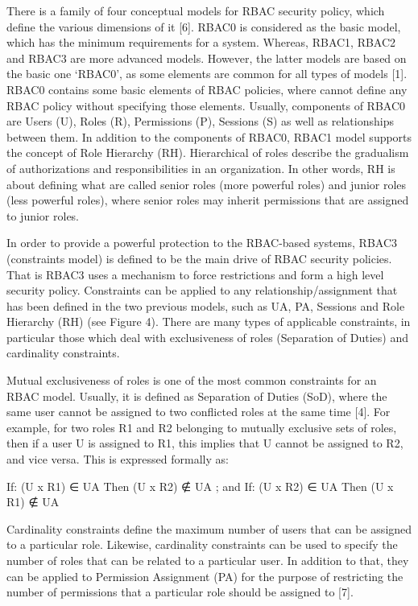 There is a family of four conceptual models for RBAC security policy, which define the various dimensions of it [6].  RBAC0 is considered as the basic model, which has the minimum requirements for a system.  Whereas, RBAC1, RBAC2 and RBAC3 are more advanced models.  However, the latter models are based on the basic one ‘RBAC0’, as some elements are common for all types of models [1].
     RBAC0 contains some basic elements of RBAC policies, where cannot define any RBAC policy without specifying those elements.  Usually, components of RBAC0 are Users (U), Roles (R), Permissions (P), Sessions (S) as well as relationships between them.  
In addition to the components of RBAC0, RBAC1 model supports the concept of Role Hierarchy (RH).  Hierarchical of roles describe the gradualism of authorizations and responsibilities in an organization.  In other words, RH is about defining what are called senior roles (more powerful roles) and junior roles (less powerful roles), where senior roles may inherit permissions that are assigned to junior roles.

      In order to provide a powerful protection to the RBAC-based systems, RBAC3 (constraints model) is defined to be the main drive of RBAC security policies.  That is RBAC3 uses a mechanism to force restrictions and form a high level security policy.  Constraints can be applied to any relationship/assignment that has been defined in the two previous models, such as UA, PA, Sessions and Role Hierarchy (RH) (see Figure 4).  There are many types of applicable constraints, in particular those which deal with exclusiveness of roles (Separation of Duties) and cardinality constraints.
      
      Mutual exclusiveness of roles is one of the most common constraints for an RBAC model.  Usually, it is defined as Separation of Duties (SoD), where the same user cannot be assigned to two conflicted roles at the same time [4].  For example, for two roles R1 and R2 belonging to mutually exclusive sets of roles, then if a user U is assigned to R1, this implies that U cannot be assigned to R2, and vice versa.  This is expressed formally as:
      
             If:  (U x R1) ∈ UA Then (U x R2) ∉ UA ;     and
       If:  (U x R2) ∈ UA Then (U x R1) ∉ UA

      Cardinality constraints define the maximum number of users that can be assigned to a particular role.  Likewise, cardinality constraints can be used to specify the number of roles that can be related to a particular user.  In addition to that, they can be applied to Permission Assignment (PA) for the purpose of restricting the number of permissions that a particular role should be assigned to [7].


